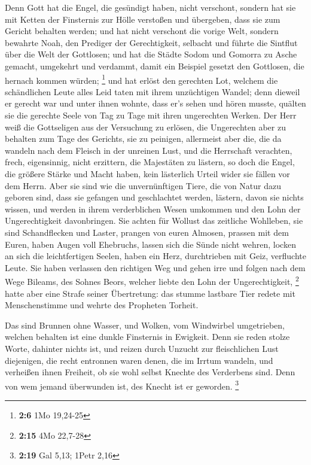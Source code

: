  Denn Gott hat die Engel, die gesündigt haben, nicht
verschont, sondern hat sie mit Ketten der Finsternis zur Hölle verstoßen
und übergeben, dass sie zum Gericht behalten werden;  und
hat nicht verschont die vorige Welt, sondern bewahrte Noah, den Prediger
der Gerechtigkeit, selbacht und führte die Sintflut über die Welt der
Gottlosen;  und hat die Städte Sodom und Gomorra zu Asche
gemacht, umgekehrt und verdammt, damit ein Beispiel gesetzt den
Gottlosen, die hernach kommen würden; \footnote{\textbf{2:6} 1Mo
  19,24-25}  und hat erlöst den gerechten Lot, welchem die
schändlichen Leute alles Leid taten mit ihrem unzüchtigen Wandel;
 denn dieweil er gerecht war und unter ihnen wohnte, dass
er's sehen und hören musste, quälten sie die gerechte Seele von Tag zu
Tage mit ihren ungerechten Werken.  Der Herr weiß die
Gottseligen aus der Versuchung zu erlösen, die Ungerechten aber zu
behalten zum Tage des Gerichts, sie zu peinigen, 
allermeist aber die, die da wandeln nach dem Fleisch in der unreinen
Lust, und die Herrschaft verachten, frech, eigensinnig, nicht erzittern,
die Majestäten zu lästern,  so doch die Engel, die größere
Stärke und Macht haben, kein lästerlich Urteil wider sie fällen vor dem
Herrn.  Aber sie sind wie die unvernünftigen Tiere, die von
Natur dazu geboren sind, dass sie gefangen und geschlachtet werden,
lästern, davon sie nichts wissen, und werden in ihrem verderblichen
Wesen umkommen  und den Lohn der Ungerechtigkeit
davonbringen. Sie achten für Wollust das zeitliche Wohlleben, sie sind
Schandflecken und Laster, prangen von euren Almosen, prassen mit dem
Euren,  haben Augen voll Ehebruchs, lassen sich die Sünde
nicht wehren, locken an sich die leichtfertigen Seelen, haben ein Herz,
durchtrieben mit Geiz, verfluchte Leute.  Sie haben
verlassen den richtigen Weg und gehen irre und folgen nach dem Wege
Bileams, des Sohnes Beors, welcher liebte den Lohn der Ungerechtigkeit,
\footnote{\textbf{2:15} 4Mo 22,7-28}  hatte aber eine
Strafe seiner Übertretung: das stumme lastbare Tier redete mit
Menschenstimme und wehrte des Propheten Torheit.

 Das sind Brunnen ohne Wasser, und Wolken, vom Windwirbel
umgetrieben, welchen behalten ist eine dunkle Finsternis in Ewigkeit.
 Denn sie reden stolze Worte, dahinter nichts ist, und
reizen durch Unzucht zur fleischlichen Lust diejenigen, die recht
entronnen waren denen, die im Irrtum wandeln,  und
verheißen ihnen Freiheit, ob sie wohl selbst Knechte des Verderbens
sind. Denn von wem jemand überwunden ist, des Knecht ist er geworden.
\footnote{\textbf{2:19} Gal 5,13; 1Petr 2,16}

